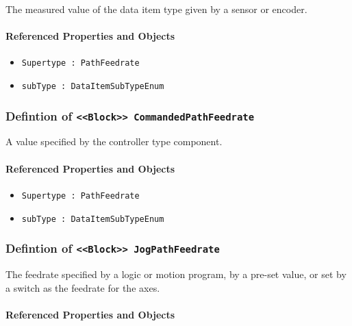 \FloatBarrier

The measured value of the data item type given by a sensor or encoder.

\FloatBarrier
\paragraph{Referenced Properties and Objects}

\begin{itemize}
\item \texttt{Supertype : PathFeedrate}

\item \texttt{subType : DataItemSubTypeEnum}

\end{itemize}
\FloatBarrier
\subsubsection{Defintion of \texttt{<<Block>> CommandedPathFeedrate}}
  \label{type:CommandedPathFeedrate}

\FloatBarrier

A value specified by the controller type component.

\FloatBarrier
\paragraph{Referenced Properties and Objects}

\begin{itemize}
\item \texttt{Supertype : PathFeedrate}

\item \texttt{subType : DataItemSubTypeEnum}

\end{itemize}
\FloatBarrier
\subsubsection{Defintion of \texttt{<<Block>> JogPathFeedrate}}
  \label{type:JogPathFeedrate}

\FloatBarrier

The feedrate specified by a logic or motion program, by a pre-set value, or set by a switch as the feedrate for the axes. 

\FloatBarrier
\paragraph{Referenced Properties and Objects}

